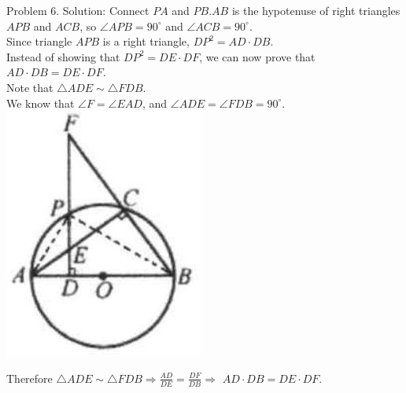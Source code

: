 \documentclass[10pt]{article}
\begin{document}
Problem 6. Solution:
Connect \(P A\) and \(P B . A B\) is the hypotenuse of right triangles \(A P B\) and \(A C B\), so \(\angle A P B=90^{\circ}\) and \(\angle A C B=90^{\circ}\).\\
Since triangle \(A P B\) is a right triangle, \(D P^{2}=A D \cdot D B\).\\
Instead of showing that \(D P^{2}=D E \cdot D F\), we can now prove that \(A D \cdot D B=D E \cdot D F\).\\
Note that \(\triangle A D E \sim \triangle F D B\).\\
We know that \(\angle F=\angle E A D\), and \(\angle A D E=\angle F D B=90^{\circ}\).\\
\includegraphics[max width=\textwidth, center]{2025_04_17_97bc1f7e44d93c271a88g-173(1)}

Therefore \(\triangle A D E \sim \triangle F D B \Rightarrow \frac{A D}{D E}=\frac{D F}{D B} \Rightarrow\) \(A D \cdot D B=D E \cdot D F\).
\end{document}
